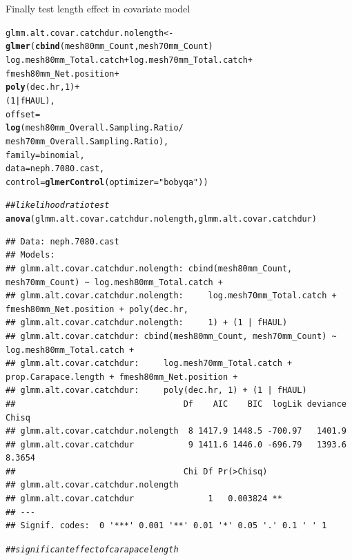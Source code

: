 \documentclass[12pt]{article}\usepackage[]{graphicx}\usepackage[]{color}
\makeatletter
\newcommand{\hlnum}[1]{\textcolor[rgb]{0.686,0.059,0.569}{#1}}%
\newcommand{\hlstr}[1]{\textcolor[rgb]{0.192,0.494,0.8}{#1}}%
\newcommand{\hlcom}[1]{\textcolor[rgb]{0.678,0.584,0.686}{\textit{#1}}}%
\newcommand{\hlopt}[1]{\textcolor[rgb]{0,0,0}{#1}}%
\newcommand{\hlstd}[1]{\textcolor[rgb]{0.345,0.345,0.345}{#1}}%
\newcommand{\hlkwb}[1]{\textcolor[rgb]{0.69,0.353,0.396}{#1}}%
\newcommand{\hlkwc}[1]{\textcolor[rgb]{0.333,0.667,0.333}{#1}}%
\newcommand{\hlkwd}[1]{\textcolor[rgb]{0.737,0.353,0.396}{\textbf{#1}}}%
\newenvironment{kframe}{%
 \def\at@end@of@kframe{}%
 \ifinner\ifhmode%
  \def\at@end@of@kframe{\end{minipage}}%
  \begin{minipage}{\columnwidth}%
 \fi\fi%
 \def\FrameCommand##1{\hskip\@totalleftmargin \hskip-\fboxsep
 \colorbox{shadecolor}{##1}\hskip-\fboxsep
     \hskip-\linewidth \hskip-\@totalleftmargin \hskip\columnwidth}%
 \MakeFramed {\advance\hsize-\width
   \@totalleftmargin\z@ \linewidth\hsize
   \@setminipage}}%
 {\par\unskip\endMakeFramed%
 \at@end@of@kframe}
\newenvironment{knitrout}{}{} %
\makeatother
\begin{document}
Finally test length effect in covariate model
\begin{knitrout}\footnotesize
{}\color{fgcolor}\begin{kframe}
\begin{alltt}
\hlstd{glmm.alt.covar.catchdur.nolength} \hlkwb{<-} \hlkwd{glmer}\hlstd{(}\hlkwd{cbind}\hlstd{(mesh80mm_Count, mesh70mm_Count)} \hlopt{~}
                                          \hlstd{log.mesh80mm_Total.catch} \hlopt{+} \hlstd{log.mesh70mm_Total.catch} \hlopt{+}
                                          \hlstd{fmesh80mm_Net.position} \hlopt{+}
                                          \hlkwd{poly}\hlstd{(dec.hr,} \hlnum{1}\hlstd{)} \hlopt{+}
                                          \hlstd{(}\hlnum{1} \hlopt{|} \hlstd{fHAUL),}
                                          \hlkwc{offset} \hlstd{=}
                                          \hlkwd{log}\hlstd{(mesh80mm_Overall.Sampling.Ratio} \hlopt{/}
                                              \hlstd{mesh70mm_Overall.Sampling.Ratio),}
                                          \hlkwc{family} \hlstd{= binomial,}
                                          \hlkwc{data} \hlstd{= neph.7080.cast,}
                                          \hlkwc{control}\hlstd{=}\hlkwd{glmerControl}\hlstd{(}\hlkwc{optimizer}\hlstd{=}\hlstr{"bobyqa"}\hlstd{))}
\end{alltt}


{\ttfamily\noindent{}}\begin{alltt}
\hlcom{## likelihood ratio test}
\hlkwd{anova}\hlstd{(glmm.alt.covar.catchdur.nolength, glmm.alt.covar.catchdur)}
\end{alltt}
\begin{verbatim}
## Data: neph.7080.cast
## Models:
## glmm.alt.covar.catchdur.nolength: cbind(mesh80mm_Count, mesh70mm_Count) ~ log.mesh80mm_Total.catch + 
## glmm.alt.covar.catchdur.nolength:     log.mesh70mm_Total.catch + fmesh80mm_Net.position + poly(dec.hr, 
## glmm.alt.covar.catchdur.nolength:     1) + (1 | fHAUL)
## glmm.alt.covar.catchdur: cbind(mesh80mm_Count, mesh70mm_Count) ~ log.mesh80mm_Total.catch + 
## glmm.alt.covar.catchdur:     log.mesh70mm_Total.catch + prop.Carapace.length + fmesh80mm_Net.position + 
## glmm.alt.covar.catchdur:     poly(dec.hr, 1) + (1 | fHAUL)
##                                  Df    AIC    BIC  logLik deviance  Chisq
## glmm.alt.covar.catchdur.nolength  8 1417.9 1448.5 -700.97   1401.9       
## glmm.alt.covar.catchdur           9 1411.6 1446.0 -696.79   1393.6 8.3654
##                                  Chi Df Pr(>Chisq)   
## glmm.alt.covar.catchdur.nolength                     
## glmm.alt.covar.catchdur               1   0.003824 **
## ---
## Signif. codes:  0 '***' 0.001 '**' 0.01 '*' 0.05 '.' 0.1 ' ' 1
\end{verbatim}
\begin{alltt}
\hlcom{## significant effect of carapace length}
\end{alltt}
\end{kframe}
\end{knitrout}
\end{document}
